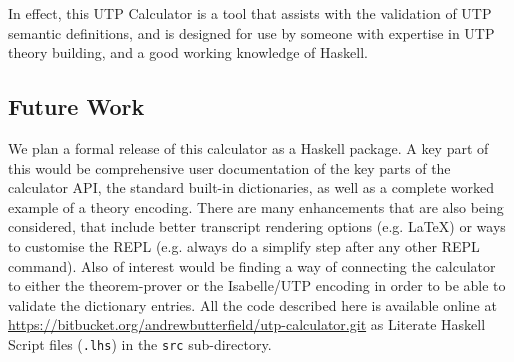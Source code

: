 In effect, this UTP Calculator is a tool that assists
with the validation of UTP semantic definitions,
and is designed for use by someone with expertise
in UTP theory building,
and a good working knowledge of Haskell.


\subsection{Future Work}

We plan a formal release of this calculator as a Haskell package.
A key part of this would be comprehensive
user documentation of the key parts of the calculator API,
the standard built-in dictionaries,
as well as a complete worked example of a theory encoding.
There are many enhancements that are also being considered,
that include better transcript rendering options
(e.g. \LaTeX) or ways to customise the REPL
(e.g. always do a simplify step after any other REPL command).
Also of interest would be finding
a way of connecting the calculator
to either the  theorem-prover\cite{DBLP:conf/utp/Butterfield10}
or the Isabelle/UTP encoding\cite{DBLP:conf/utp/FosterZW14}
in order to be able to validate the dictionary entries.
All the code described here is available online
at
\\\url{https://bitbucket.org/andrewbutterfield/utp-calculator.git}
as Literate Haskell Script files (\texttt{.lhs})
in the \texttt{src} sub-directory.
